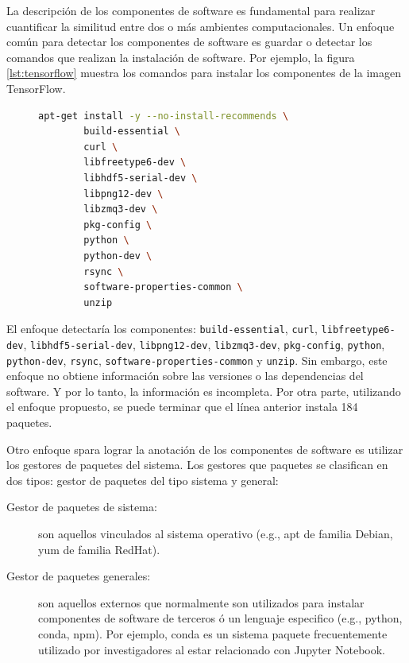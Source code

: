 La descripción de los componentes de software es fundamental para realizar cuantificar la similitud entre dos o más ambientes computacionales.
Un enfoque común para detectar los componentes de software es guardar o detectar los comandos que realizan la instalación de software. Por ejemplo, la figura \ref{lst:tensorflow} muestra los comandos para instalar los componentes de la imagen TensorFlow. 
\begin{figure}
	\begin{lstlisting}[caption={Ejemplo de instalación de dependencias para la imagen TensorFlow},label={lst:tensorflow},language=bash]
apt-get install -y --no-install-recommends \
        build-essential \
        curl \
        libfreetype6-dev \
        libhdf5-serial-dev \
        libpng12-dev \
        libzmq3-dev \
        pkg-config \
        python \
        python-dev \
        rsync \
        software-properties-common \
        unzip	
\end{lstlisting}

\end{figure}

El enfoque detectaría los componentes: \verb|build-essential|, \verb|curl|, \verb|libfreetype6-dev|, \verb|libhdf5-serial-dev|, \verb|libpng12-dev|, \verb|libzmq3-dev|, \verb|pkg-config|, \verb|python|, \verb|python-dev|, \verb|rsync|, \verb|software-properties-common| y  \verb|unzip|. Sin embargo, este enfoque no obtiene información sobre las versiones o las dependencias del software. Y por lo tanto, la información es incompleta. 
Por otra parte, utilizando el enfoque propuesto, se puede terminar que el línea anterior instala 184 paquetes.

Otro enfoque spara lograr la anotación de los componentes de software es utilizar los gestores de paquetes del sistema. Los gestores que paquetes se clasifican en dos tipos: gestor de paquetes del tipo sistema y general:

\begin{description}
	\item  [Gestor de paquetes de sistema:] son aquellos vinculados al sistema operativo (e.g., apt de familia Debian, yum de familia RedHat).
	\item [Gestor de paquetes generales:] son aquellos externos que normalmente son utilizados para instalar componentes de software de terceros ó un lenguaje especifico (e.g., python, conda, npm). Por ejemplo, conda es un sistema paquete frecuentemente utilizado por investigadores al estar relacionado con Jupyter Notebook.
\end{description}

